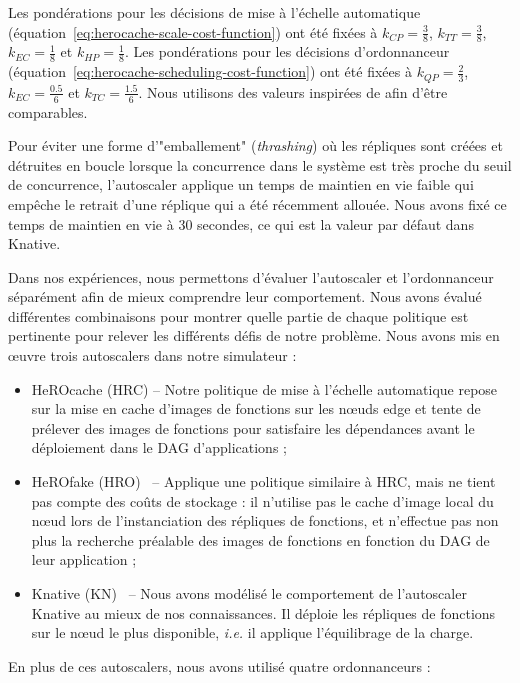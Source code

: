 Les pondérations pour les décisions de mise à l'échelle automatique (équation~\ref{eq:herocache-scale-cost-function}) ont été fixées à $k_{CP} = \frac{3}{8}$, $k_{TT} = \frac{3}{8}$, $k_{EC} = \frac{1}{8}$ et $k_{HP} = \frac{1}{8}$. Les pondérations pour les décisions d'ordonnanceur (équation~\ref{eq:herocache-scheduling-cost-function}) ont été fixées à $k_{QP} = \frac{2}{3}$, $k_{EC} = \frac{0.5}{6}$ et $k_{TC} = \frac{1.5}{6}$. Nous utilisons des valeurs inspirées de \cite{herofake} afin d'être comparables.

Pour éviter une forme d'"emballement" (\textit{thrashing}) où les répliques sont créées et détruites en boucle lorsque la concurrence dans le système est très proche du seuil de concurrence, l'autoscaler applique un temps de maintien en vie faible qui empêche le retrait d'une réplique qui a été récemment allouée. Nous avons fixé ce temps de maintien en vie à 30 secondes, ce qui est la valeur par défaut dans Knative.

Dans nos expériences, nous permettons d'évaluer l'autoscaler et l'ordonnanceur séparément afin de mieux comprendre leur comportement. Nous avons évalué différentes combinaisons pour montrer quelle partie de chaque politique est pertinente pour relever les différents défis de notre problème. Nous avons mis en œuvre trois autoscalers dans notre simulateur :

\begin{itemize}
    \item HeROcache (HRC) -- Notre politique de mise à l'échelle automatique repose sur la mise en cache d'images de fonctions sur les nœuds edge et tente de prélever des images de fonctions pour satisfaire les dépendances avant le déploiement dans le DAG d'applications ;
    \item HeROfake (HRO)~\cite{herofake} -- Applique une politique similaire à HRC, mais ne tient pas compte des coûts de stockage : il n'utilise pas le cache d'image local du nœud lors de l'instanciation des répliques de fonctions, et n'effectue pas non plus la recherche préalable des images de fonctions en fonction du DAG de leur application ;
    \item Knative (KN)~\cite{sureshENSUREEfficientScheduling2020} -- Nous avons modélisé le comportement de l'autoscaler Knative au mieux de nos connaissances. Il déploie les répliques de fonctions sur le nœud le plus disponible, \textit{i.e.} il applique l'équilibrage de la charge.
\end{itemize}

En plus de ces autoscalers, nous avons utilisé quatre ordonnanceurs :

